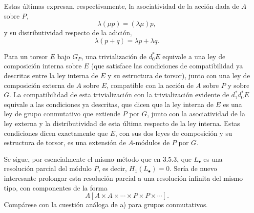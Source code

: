 
Estas últimas expresan, respectivamente, la asociatividad de la acción
dada de $A$ sobre $P$,
\[
 \lambda(\mu p)=(\lambda\mu)p,
\]
y su distributividad respecto de la adición,
\[
 \lambda(p+q)=\lambda p+\lambda q.
\]

Para un torsor $E$ bajo $G_P$, una trivialización de $d_0^*E$ equivale a
una ley de composición interna sobre $E$ (que satisface las condiciones
de compatibilidad ya descritas entre la ley interna de $E$ y su estructura
de torsor), junto con una ley de composición externa de $A$ sobre $E$,
compatible con la acción de $A$ sobre $P$ y sobre $G$. La compatibilidad
de esta trivialización con la trivialización evidente de $d_1^*d_0^*E$
equivale a las condiciones ya descritas, que dicen que la ley interna de
$E$ es una ley de grupo conmutativo que extiende $P$ por $G$, junto con la
asociatividad de la ley externa y la distributividad de esta última
respecto de la ley interna. Estas condiciones dicen exactamente que $E$,
con sus dos leyes de composición y su estructura de torsor, es una
extensión de $A$-módulos de $P$ por $G$.

Se sigue, por esencialmente el mismo método que en 3.5.3, que
$L_\bullet$ es una resolución parcial del módulo $P$, es decir,
$H_1(L_\bullet)=0$. Sería de nuevo interesante prolongar esta resolución
parcial a una resolución infinita del mismo tipo, con componentes de la
forma
\[
 A[A\times A\times\cdots\times P\times P\times\cdots].
\]
Compárese con la cuestión análoga de a) para grupos conmutativos.

